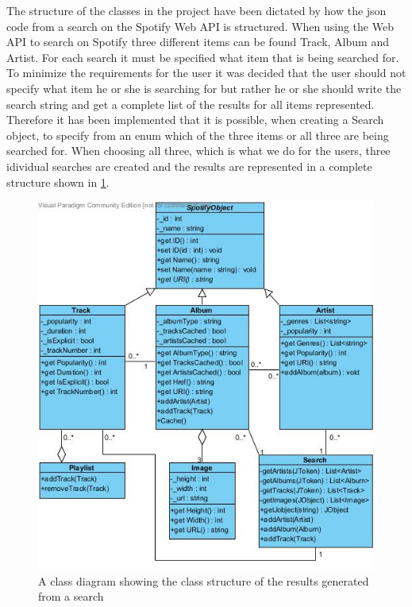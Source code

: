 The structure of the classes in the project have been dictated by how the json code from a search on the Spotify Web API is structured. When using the Web API to search on Spotify three different items can be found Track, Album and Artist. For each search it must be specified what item that is being searched for. To minimize the requirements for the user it was decided that the user should not specify what item he or she is searching for but rather he or she should write the search string and get a complete list of the results for all items represented. Therefore it has been implemented that it is possible, when creating a Search object, to specify from an enum which of the three items or all three are being searched for. When choosing all three, which is what we do for the users, three idividual searches are created and the results are represented in a complete structure shown in \cref{fig:WebAPIUML}.

\begin{figure}
  \centering
  \includegraphics[width=0.5\linewidth]{Images/WebAPIUML.jpg}
  \caption{A class diagram showing the class structure of the results generated from a search}
  \label{fig:WebAPIUML}
\end{figure}